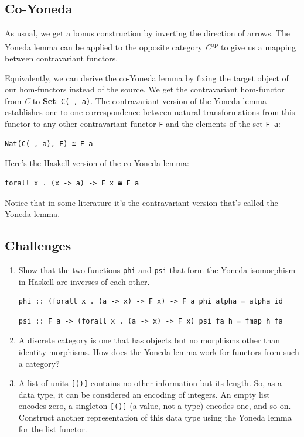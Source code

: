 \subsection{Co-Yoneda}\label{co-yoneda}

As usual, we get a bonus construction by inverting the direction of
arrows. The Yoneda lemma can be applied to the opposite category
\emph{C}\textsuperscript{op} to give us a mapping between contravariant
functors.

Equivalently, we can derive the co-Yoneda lemma by fixing the target
object of our hom-functors instead of the source. We get the
contravariant hom-functor from \emph{C} to \textbf{Set}:
\texttt{C(-,\ a)}. The contravariant version of the Yoneda lemma
establishes one-to-one correspondence between natural transformations
from this functor to any other contravariant functor \texttt{F} and the
elements of the set \texttt{F\ a}:

\begin{verbatim}
Nat(C(-, a), F) ≅ F a
\end{verbatim}

Here's the Haskell version of the co-Yoneda lemma:

\begin{verbatim}
forall x . (x -> a) -> F x ≅ F a
\end{verbatim}

Notice that in some literature it's the contravariant version that's
called the Yoneda lemma.

\subsection{Challenges}\label{challenges}

\begin{enumerate}
\item
  Show that the two functions \texttt{phi} and \texttt{psi} that form
  the Yoneda isomorphism in Haskell are inverses of each other.

\begin{verbatim}
phi :: (forall x . (a -> x) -> F x) -> F a phi alpha = alpha id
\end{verbatim}

\begin{verbatim}
psi :: F a -> (forall x . (a -> x) -> F x) psi fa h = fmap h fa
\end{verbatim}
\item
  A discrete category is one that has objects but no morphisms other
  than identity morphisms. How does the Yoneda lemma work for functors
  from such a category?
\item
  A list of units \texttt{{[}(){]}} contains no other information but
  its length. So, as a data type, it can be considered an encoding of
  integers. An empty list encodes zero, a singleton \texttt{{[}(){]}} (a
  value, not a type) encodes one, and so on. Construct another
  representation of this data type using the Yoneda lemma for the list
  functor.
\end{enumerate}

